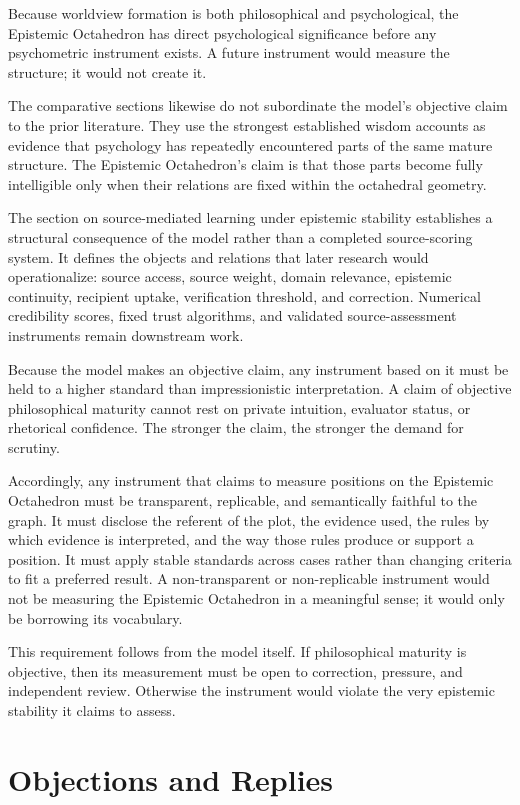 \documentclass[11pt]{article}
\begin{document}
Because worldview formation is both philosophical and psychological, the Epistemic Octahedron has direct psychological significance before any psychometric instrument exists. A future instrument would measure the structure; it would not create it.

The comparative sections likewise do not subordinate the model's objective claim to the prior literature. They use the strongest established wisdom accounts as evidence that psychology has repeatedly encountered parts of the same mature structure. The Epistemic Octahedron's claim is that those parts become fully intelligible only when their relations are fixed within the octahedral geometry.

The section on source-mediated learning under epistemic stability establishes a structural consequence of the model rather than a completed source-scoring system. It defines the objects and relations that later research would operationalize: source access, source weight, domain relevance, epistemic continuity, recipient uptake, verification threshold, and correction. Numerical credibility scores, fixed trust algorithms, and validated source-assessment instruments remain downstream work.

Because the model makes an objective claim, any instrument based on it must be held to a higher standard than impressionistic interpretation. A claim of objective philosophical maturity cannot rest on private intuition, evaluator status, or rhetorical confidence. The stronger the claim, the stronger the demand for scrutiny.

Accordingly, any instrument that claims to measure positions on the Epistemic Octahedron must be transparent, replicable, and semantically faithful to the graph. It must disclose the referent of the plot, the evidence used, the rules by which evidence is interpreted, and the way those rules produce or support a position. It must apply stable standards across cases rather than changing criteria to fit a preferred result. A non-transparent or non-replicable instrument would not be measuring the Epistemic Octahedron in a meaningful sense; it would only be borrowing its vocabulary.

This requirement follows from the model itself. If philosophical maturity is objective, then its measurement must be open to correction, pressure, and independent review. Otherwise the instrument would violate the very epistemic stability it claims to assess.

\section{Objections and Replies}
\end{document}

